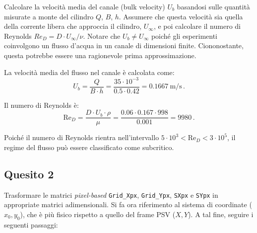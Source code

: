 Calcolare la velocità media del canale (bulk velocity) $U_b$ basandosi sulle quantità misurate a monte del cilindro $Q$, $B$, $h$. Assumere che questa velocità sia quella della corrente libera che approccia il cilindro, $U_{\infty}$, e poi calcolare il numero di Reynolds $Re_D = D \cdot U_{\infty} / \nu$. Notare che $U_b \neq U_{\infty}$ poiché gli esperimenti coinvolgono un flusso d'acqua in un canale di dimensioni finite. Ciononostante, questa potrebbe essere una ragionevole prima approssimazione.

\NotionDivider

La velocità media del flusso nel canale è calcolata come:
\[
U_b = \frac{Q}{B \cdot h} = \frac{35\cdot 10^{-3}}{0.5\cdot 0.42}  = 0.1667 ~ \text{m/s}\,.
\]

Il numero di Reynolds è:
\[
\text{Re}_D = \frac{D \cdot U_b \cdot \rho}{\mu} = \frac{0.06 \cdot 0.167 \cdot 998}{0.001} = 9980\,.
\]

Poiché il numero di Reynolds  rientra nell'intervallo $5 \cdot 10^3 < \text{Re}_D < 3 \cdot 10^5$, il regime del flusso può essere classificato come subcritico.

\subsection*{Quesito 2}

Trasformare le matrici \emph{pixel-based} \texttt{Grid\_Xpx}, \texttt{Grid\_Ypx}, \texttt{SXpx} e \texttt{SYpx} in appropriate matrici adimensionali. Si fa ora riferimento al sistema di coordinate ($x_0, y_0$), che è più fisico rispetto a quello del frame PSV ($X, Y$). A tal fine, seguire i seguenti passaggi:


